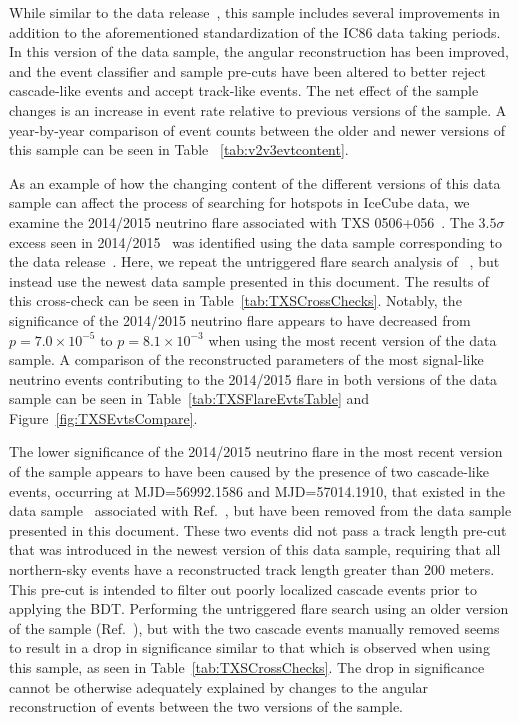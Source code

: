 \documentclass[aps,10pt,prd,twocolumn,floats,letterpaper,showpacs,nofootinbib,bibnotes,notitlepage,superscriptaddress,floatfix]{revtex4-1}
\begin{document}
While similar  to the data release~\cite{IceCube:2019}, this sample includes several improvements in addition to the aforementioned standardization of the IC86 data taking periods. In this version of the data sample, the angular reconstruction has been improved, and the event classifier and sample pre-cuts have been altered to better reject cascade-like events and accept track-like events. The net effect of the sample changes is an increase in event rate relative to previous versions of the sample. A year-by-year comparison of event counts between the older and newer versions of this sample can be seen in Table ~\ref{tab:v2v3evtcontent}.

As an example of how the changing content of the different versions of this data sample can affect the process of searching for hotspots in IceCube data, we examine the 2014/2015 neutrino flare associated with TXS 0506+056~\cite{IceCube:2018cha}. The $3.5 \sigma$ excess seen in 2014/2015~\cite{IceCube:2018cha} was identified using the data sample corresponding to the data release~\cite{IceCube:2019}. Here, we repeat the untriggered flare search analysis of ~\cite{IceCube:2018cha}, but instead use the newest data sample presented in this document. The results of this cross-check can be seen in Table~\ref{tab:TXSCrossChecks}. Notably, the significance of the 2014/2015 neutrino flare appears to have decreased from $p=7.0 \times 10^{-5}$ to $p=8.1 \times 10^{-3}$ when using the most recent version of the data sample. A comparison of the reconstructed parameters of the most signal-like neutrino events contributing to the 2014/2015 flare in both versions of the data sample can be seen in Table~\ref{tab:TXSFlareEvtsTable} and Figure~\ref{fig:TXSEvtsCompare}.

The lower significance of the 2014/2015 neutrino flare in the most recent version of the sample appears to have been caused by the presence of two cascade-like events, occurring at MJD=56992.1586 and MJD=57014.1910, that existed in the data sample~\cite{IceCube:2019} associated with Ref.~\cite{IceCube:2018cha}, but have been removed from the data sample presented in this document. These two events did not pass a track length pre-cut that was introduced in the newest version of this data sample, requiring that all northern-sky events have a reconstructed track length greater than 200 meters. This pre-cut is intended to filter out poorly localized cascade events prior to applying the BDT. Performing the untriggered flare search using an older version of the sample (Ref.~\cite{IceCube:2019}), but with the two cascade events manually removed seems to result in a drop in significance similar to that which is observed when using this sample, as seen in Table~\ref{tab:TXSCrossChecks}. The drop in significance cannot be otherwise adequately explained by changes to the angular reconstruction of events between the two versions of the sample. 
\end{document}
